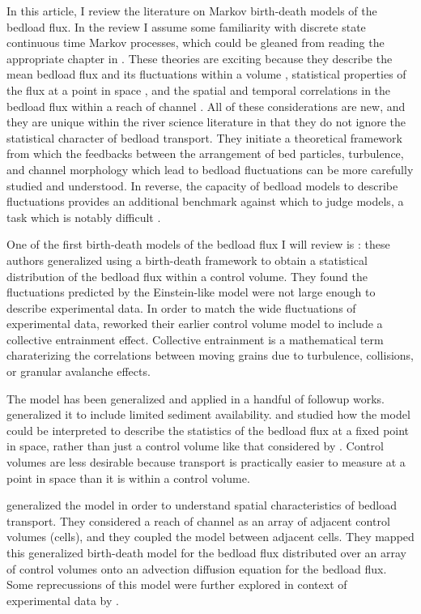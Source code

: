 In this article, I review the literature on Markov birth-death models of the bedload flux.
In the review I assume some familiarity with discrete state continuous time Markov processes, which could be gleaned from reading the appropriate chapter in \citet{Cox1965}. 
These theories are exciting because they describe the mean bedload flux and its fluctuations within a volume \citep{Ancey2006, Ancey2008, Turowski2009}, statistical properties of the flux at a point in space \citep{Heyman2013, Ma2014}, and the spatial and temporal correlations in the bedload flux within a reach of channel \citep{Ancey2014, Ancey2015}. 
All of these considerations are new, and they are unique within the river science literature in that they do not ignore the statistical character of bedload transport. 
They initiate a theoretical framework from which the feedbacks between the arrangement of bed particles, turbulence, and channel morphology which lead to bedload fluctuations can be more carefully studied and understood. 
In reverse, the capacity of bedload models to describe fluctuations provides an additional benchmark against which to judge models, a task which is notably difficult \citep{Iverson2013}. 

One of the first birth-death models of the bedload flux I will review is \citet{Ancey2006}: these authors generalized \citet{Einstein1950} using a birth-death framework to obtain a statistical distribution of the bedload flux within a control volume. 
They found the fluctuations predicted by the Einstein-like model were not large enough to describe experimental data.  
In order to match the wide fluctuations of experimental data, \citet{Ancey2008} reworked their earlier control volume model to include a collective entrainment effect.
Collective entrainment is a mathematical term charaterizing the correlations between moving grains due to turbulence, collisions, or granular avalanche effects.

The \citet{Ancey2008} model has been generalized and applied in a handful of followup works. 
\citet{Turowski2009} generalized it to include limited sediment availability. 
\citet{Heyman2013} and \citet{Ma2014} studied how the \citet{Ancey2008} model could be interpreted to describe the statistics of the bedload flux at a fixed point in space, rather than just a control volume like that considered by \citet{Einstein1950}. 
Control volumes are less desirable because transport is practically easier to measure at a point in space than it is within a control volume. 

\citet{Ancey2014, Ancey2015} generalized the \citet{Ancey2008} model in order to understand spatial characteristics of bedload transport. 
They considered a reach of channel as an array of adjacent control volumes (cells), and they coupled the \citet{Ancey2008} model between adjacent cells. 
They mapped this generalized birth-death model for the bedload flux distributed over an array of control volumes onto an advection diffusion equation for the bedload flux. 
Some reprecussions of this model were further explored in context of experimental data by \citet{Heyman2014}. 

